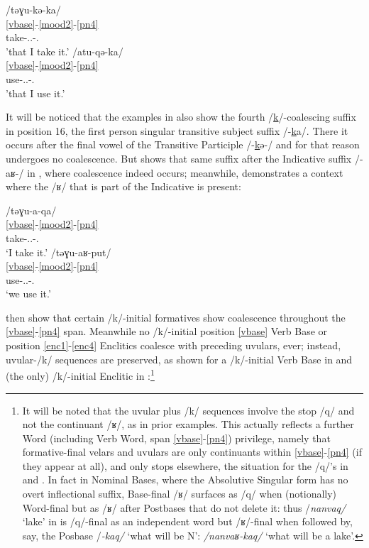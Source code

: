 \documentclass[output=paper]{langscibook}
\begin{document}
\ea\label{ex:key:45}
\ea\label{ex:key:45a}
\glll /tǝɣu-kǝ-ka/\\
    \ref{vbase}-\ref{mood2}-\ref{pn4} \\
     take-\Trprt.\Tsg.\Obj{}-\Fsg.\Aarg{}\\
\glt {}'that I take it.'
\ex\label{ex:key:45b}
\glll /atu{}-qǝ-ka/\\
    \ref{vbase}-\ref{mood2}-\ref{pn4} \\
     use-\Trprt.\Tsg.\Obj{}-\Fsg.\Aarg{}\\
\glt {}'that I use it.'
\z
\z

It will be noticed that the examples in  also show the fourth /\ul{k}/-coalescing suffix in position 16, the first person singular transitive subject suffix /-\ul{k}a/. There it occurs after the final vowel of the Transitive Participle /-\ul{k}ǝ-/ and for that reason undergoes no coalescence. But  shows that same suffix after the Indicative suffix /-aʁ-/ in , where coalescence indeed occurs; meanwhile,  demonstrates a context where the /ʁ/ that is part of the Indicative is present:

\ea\label{ex:key:46}
\ea\label{ex:key:46a}\glll /tǝɣu-a-qa/\\
    \ref{vbase}-\ref{mood2}-\ref{pn4}\\
     take-\Ind{}.\Tsg.\Obj{}-\Fsg.\Aarg{}\\
\glt {}`I take it.'
\ex\label{ex:key:46b}
\glll /tǝɣu-aʁ-put/\\
    \ref{vbase}-\ref{mood2}-\ref{pn4} \\
     use-\Ind{}.\Tsg.\Obj{}-\Fpl.\Aarg{}\\
\glt {}`we use it.'
\z
\z

\hspace*{-2.1pt} then show that certain /k/-initial formatives show coalescence throughout the \ref{vbase}-\ref{pn4} span. Meanwhile no /k/-initial position \ref{vbase} Verb Base or position \ref{enc1}-\ref{enc4} Enclitics coalesce with preceding uvulars, ever; instead, uvular-/k/ sequences are preserved, as shown for a /k/-initial Verb Base in  and (the only) /k/-initial Enclitic in :\footnote{It will be noted that the uvular plus /k/ sequences involve the stop /q/ and not the continuant /ʁ/, as in prior examples. This actually reflects a further Word (including Verb Word, span \ref{vbase}-\ref{pn4}) privilege, namely that formative-final velars and uvulars are only continuants within \ref{vbase}-\ref{pn4} (if they appear at all), and only stops elsewhere, the situation for the /q/'s in  and . In fact in Nominal Bases, where the Absolutive Singular form has no overt inflectional suffix, Base-final /ʁ/ surfaces as /q/ when (notionally) Word-final but as /ʁ/ after Postbases that do not delete it: thus /\textit{nanvaq/} `lake' in  is /q/-final as an independent word but /ʁ/-final when followed by, say, the Posbase /\textit{{}-kaq/} `what will be N': \textit{/nanvaʁ-kaq/} `what will be a lake'.}
\end{document}
